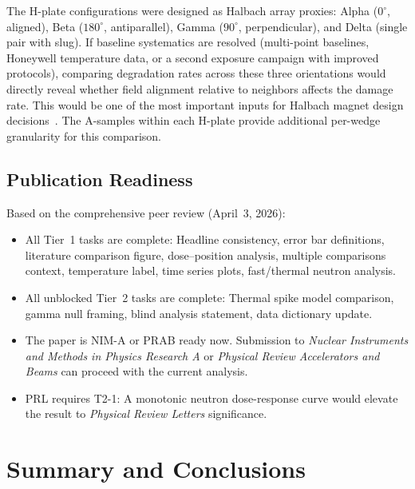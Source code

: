 \documentclass[11pt,letterpaper]{article}
\begin{document}
\begin{description}[style=nextline]
    \item[T3-5: Resolve H-Plate Configuration Differences for Halbach Design]
    The H-plate configurations were designed as Halbach array proxies:
    Alpha ($0^\circ$, aligned), Beta ($180^\circ$, antiparallel), Gamma
    ($90^\circ$, perpendicular), and Delta (single pair with slug). If
    baseline systematics are resolved (multi-point baselines, Honeywell
    temperature data, or a second exposure campaign with improved protocols),
    comparing degradation rates across these three orientations would directly
    reveal whether field alignment relative to neighbors affects the damage
    rate. This would be one of the most important inputs for Halbach magnet
    design decisions~\cite{NGotta2024}. The A-samples within each H-plate
    provide additional per-wedge granularity for this comparison.
\end{description}

\subsection{Publication Readiness}

Based on the comprehensive peer review (April~3, 2026):

\begin{itemize}
    \item All Tier~1 tasks are complete: Headline consistency, error
    bar definitions, literature comparison figure, dose--position analysis,
    multiple comparisons context, temperature label, time series plots,
    fast/thermal neutron analysis.

    \item All unblocked Tier~2 tasks are complete: Thermal spike
    model comparison, gamma null framing, blind analysis statement, data
    dictionary update.

    \item The paper is NIM-A or PRAB ready now. Submission to
    \textit{Nuclear Instruments and Methods in Physics Research A} or
    \textit{Physical Review Accelerators and Beams} can proceed with the
    current analysis.

    \item PRL requires T2-1: A monotonic neutron dose-response curve
    would elevate the result to \textit{Physical Review Letters} significance.
\end{itemize}

\section{Summary and Conclusions}
\label{sec:conclusions}
\end{document}
